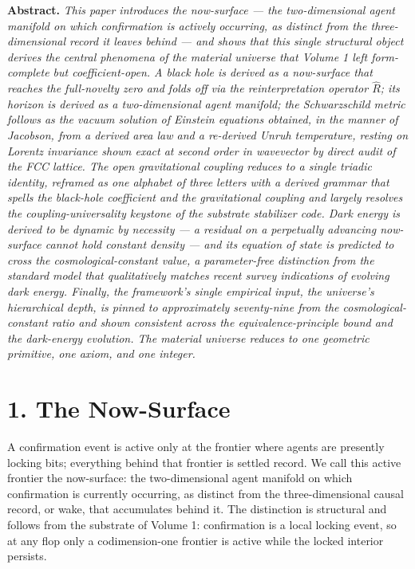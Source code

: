 \documentclass[11pt,oneside]{report}
\theoremstyle{definition}
\theoremstyle{remark}
\newenvironment{paperabstract}
  {\begin{center}\begin{minipage}{0.88\textwidth}\small
   \noindent\textbf{Abstract.}\itshape\space}
  {\end{minipage}\end{center}\vspace{0.4em}}
\begin{document}
\begin{paperabstract}
This paper introduces the now-surface --- the two-dimensional agent
manifold on which confirmation is actively occurring, as distinct from
the three-dimensional record it leaves behind --- and shows that this
single structural object derives the central phenomena of the material
universe that Volume 1 left form-complete but coefficient-open. A black
hole is derived as a now-surface that reaches the full-novelty zero and
folds off via the reinterpretation operator \ensuremath{\hat{R}}; its
horizon is derived as a two-dimensional agent manifold; the Schwarzschild
metric follows as the vacuum solution of Einstein equations obtained, in
the manner of Jacobson, from a derived area law and a re-derived Unruh
temperature, resting on Lorentz invariance shown exact at second order in
wavevector by direct audit of the FCC lattice. The open gravitational
coupling reduces to a single triadic identity, reframed as one alphabet
of three letters with a derived grammar that spells the black-hole
coefficient and the gravitational coupling and largely resolves the
coupling-universality keystone of the substrate stabilizer code. Dark
energy is derived to be dynamic by necessity --- a residual on a
perpetually advancing now-surface cannot hold constant density --- and
its equation of state is predicted to cross the cosmological-constant
value, a parameter-free distinction from the standard model that
qualitatively matches recent survey indications of evolving dark energy.
Finally, the framework's single empirical input, the universe's
hierarchical depth, is pinned to approximately seventy-nine from the
cosmological-constant ratio and shown consistent across the
equivalence-principle bound and the dark-energy evolution. The material
universe reduces to one geometric primitive, one axiom, and one integer.
\end{paperabstract}

\section*{1. The Now-Surface}

A confirmation event is active only at the frontier where agents are
presently locking bits; everything behind that frontier is settled
record. We call this active frontier the now-surface: the two-dimensional
agent manifold on which confirmation is currently occurring, as distinct
from the three-dimensional causal record, or wake, that accumulates
behind it. The distinction is structural and follows from the substrate
of Volume 1: confirmation is a local locking event, so at any flop only a
codimension-one frontier is active while the locked interior persists.
\end{document}
